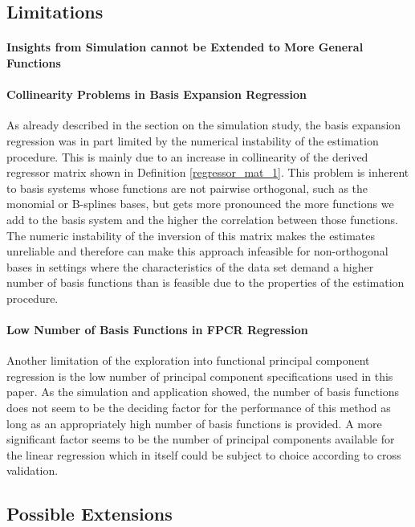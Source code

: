 \documentclass[11pt,twoside,a4paper]{article}
\begin{document}
	\subsection{Limitations}
	
	\paragraph{Insights from Simulation cannot be Extended to More General Functions}
	
	\paragraph{Collinearity Problems in Basis Expansion Regression}
	As already described in the section on the simulation study, the basis expansion regression was in part limited by the numerical instability of the estimation procedure. This is mainly due to an increase in collinearity of the derived regressor matrix shown in Definition \ref{regressor_mat_1}. This problem is inherent to basis systems whose functions are not pairwise orthogonal, such as the monomial or B-splines bases, but gets more pronounced the more functions we add to the basis system and the higher the correlation between those functions. \\
	The numeric instability of the inversion of this matrix makes the estimates unreliable and therefore can make this approach infeasible for non-orthogonal bases in settings where the characteristics of the data set demand a higher number of basis functions than is feasible due to the properties of the estimation procedure.
	
	\paragraph{Low Number of Basis Functions in FPCR Regression}
	Another limitation of the exploration into functional principal component regression is the low number of principal component specifications used in this paper. As the simulation and application showed, the number of basis functions does not seem to be the deciding factor for the performance of this method as long as an appropriately high number of basis functions is provided. 
	A more significant factor seems to be the number of principal components available for the linear regression which in itself could be subject to choice according to cross validation.
	
	\subsection{Possible Extensions}
	
\end{document}
